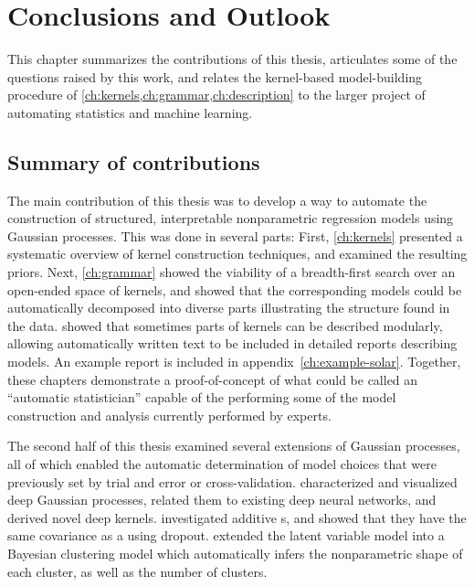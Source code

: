 
\inbpdocument

\chapter{Conclusions and Outlook}
\label{ch:discussion}

This chapter summarizes the contributions of this thesis, articulates some of the questions raised by this work, and relates the kernel-based model-building procedure of \cref{ch:kernels,ch:grammar,ch:description} to the larger project of automating statistics and machine learning.


\section{Summary of contributions}

The main contribution of this thesis was to develop a way to automate the construction of structured, interpretable nonparametric regression models using Gaussian processes.
This was done in several parts:
First, \cref{ch:kernels} presented a systematic overview of kernel construction techniques, and examined the resulting \gp{} priors.
Next, \cref{ch:grammar} showed the viability of a breadth-first search over an open-ended space of kernels, and showed that the corresponding \gp{} models could be automatically decomposed into diverse parts illustrating the structure found in the data.
 showed that sometimes parts of kernels can be described modularly, allowing automatically written text to be included in detailed reports describing \gp{} models.
An example report is included in appendix~\ref{ch:example-solar}.
Together, these chapters demonstrate a proof-of-concept of what could be called an ``automatic statistician'' capable of the performing some of the model construction and analysis currently performed by experts.

The second half of this thesis examined several extensions of Gaussian processes, all of which enabled the automatic determination of model choices that were previously set by trial and error or cross-validation.
 characterized and visualized deep Gaussian processes, related them to existing deep neural networks, and derived novel deep kernels.
 investigated additive \gp{}s, %
and showed that they have the same covariance as a \gp{} using dropout.
 extended the \gp{} latent variable model into a Bayesian clustering model which automatically infers the nonparametric shape of each cluster, as well as the number of clusters.

